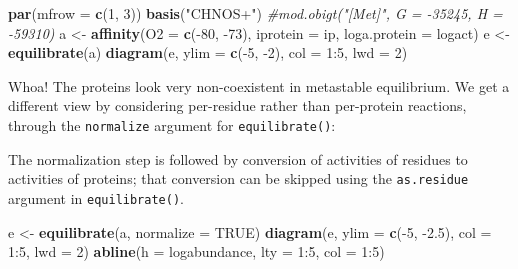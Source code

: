 \documentclass[]{tufte-handout}
\newenvironment{Shaded}{}{}
\newcommand{\KeywordTok}[1]{\textcolor[rgb]{0.00,0.44,0.13}{\textbf{#1}}}
\newcommand{\DataTypeTok}[1]{\textcolor[rgb]{0.56,0.13,0.00}{#1}}
\newcommand{\DecValTok}[1]{\textcolor[rgb]{0.25,0.63,0.44}{#1}}
\newcommand{\FloatTok}[1]{\textcolor[rgb]{0.25,0.63,0.44}{#1}}
\newcommand{\StringTok}[1]{\textcolor[rgb]{0.25,0.44,0.63}{#1}}
\newcommand{\CommentTok}[1]{\textcolor[rgb]{0.38,0.63,0.69}{\textit{#1}}}
\newcommand{\OtherTok}[1]{\textcolor[rgb]{0.00,0.44,0.13}{#1}}
\newcommand{\OperatorTok}[1]{\textcolor[rgb]{0.40,0.40,0.40}{#1}}
\newcommand{\NormalTok}[1]{#1}
\begin{document}
\begin{Shaded}
\begin{Highlighting}[]
\KeywordTok{par}\NormalTok{(}\DataTypeTok{mfrow =} \KeywordTok{c}\NormalTok{(}\DecValTok{1}\NormalTok{, }\DecValTok{3}\NormalTok{))}
\KeywordTok{basis}\NormalTok{(}\StringTok{"CHNOS+"}\NormalTok{)}
\CommentTok{#mod.obigt("[Met]", G = -35245, H = -59310)}
\NormalTok{a <-}\StringTok{ }\KeywordTok{affinity}\NormalTok{(}\DataTypeTok{O2 =} \KeywordTok{c}\NormalTok{(}\OperatorTok{-}\DecValTok{80}\NormalTok{, }\OperatorTok{-}\DecValTok{73}\NormalTok{), }\DataTypeTok{iprotein =}\NormalTok{ ip, }\DataTypeTok{loga.protein =}\NormalTok{ logact)}
\NormalTok{e <-}\StringTok{ }\KeywordTok{equilibrate}\NormalTok{(a)}
\KeywordTok{diagram}\NormalTok{(e, }\DataTypeTok{ylim =} \KeywordTok{c}\NormalTok{(}\OperatorTok{-}\DecValTok{5}\NormalTok{, }\OperatorTok{-}\DecValTok{2}\NormalTok{), }\DataTypeTok{col =} \DecValTok{1}\OperatorTok{:}\DecValTok{5}\NormalTok{, }\DataTypeTok{lwd =} \DecValTok{2}\NormalTok{)}
\end{Highlighting}
\end{Shaded}

Whoa! The proteins look very non-coexistent in metastable equilibrium.
We get a different view by considering per-residue rather than
per-protein reactions, through the \texttt{normalize} argument for
{\texttt{equilibrate()}}:

\begin{marginfigure}
The normalization step is followed by conversion of activities of
residues to activities of proteins; that conversion can be skipped using
the \texttt{as.residue} argument in {\texttt{equilibrate()}}.
\end{marginfigure}

\begin{Shaded}
\begin{Highlighting}[]
\NormalTok{e <-}\StringTok{ }\KeywordTok{equilibrate}\NormalTok{(a, }\DataTypeTok{normalize =} \OtherTok{TRUE}\NormalTok{)}
\KeywordTok{diagram}\NormalTok{(e, }\DataTypeTok{ylim =} \KeywordTok{c}\NormalTok{(}\OperatorTok{-}\DecValTok{5}\NormalTok{, }\OperatorTok{-}\FloatTok{2.5}\NormalTok{), }\DataTypeTok{col =} \DecValTok{1}\OperatorTok{:}\DecValTok{5}\NormalTok{, }\DataTypeTok{lwd =} \DecValTok{2}\NormalTok{)}
\KeywordTok{abline}\NormalTok{(}\DataTypeTok{h =}\NormalTok{ logabundance, }\DataTypeTok{lty =} \DecValTok{1}\OperatorTok{:}\DecValTok{5}\NormalTok{, }\DataTypeTok{col =} \DecValTok{1}\OperatorTok{:}\DecValTok{5}\NormalTok{)}
\end{Highlighting}
\end{Shaded}
\end{document}
